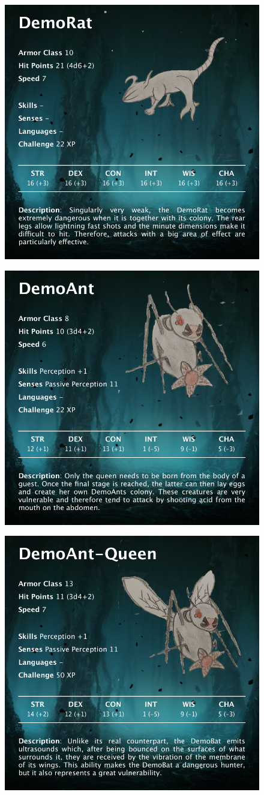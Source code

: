 \begin{figure}[H]
	\centering
	\includegraphics[width=0.7\linewidth]{images/visual_stats/demorat.png}
\end{figure}


\begin{figure}[H]
	\centering
	\includegraphics[width=0.7\linewidth]{images/visual_stats/demoant.png}
\end{figure}


\begin{figure}[H]
	\centering
	\includegraphics[width=0.7\linewidth]{images/visual_stats/demoant-queen.png}
\end{figure}


